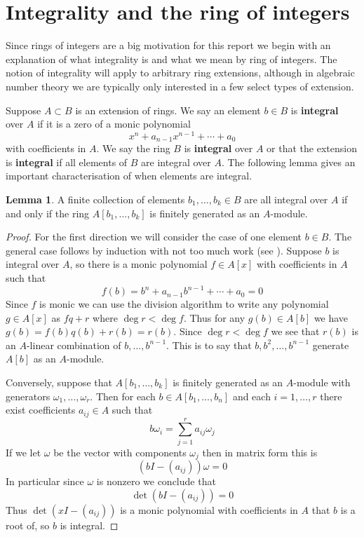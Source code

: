\documentclass{article}
\theoremstyle{definition}
\newcounter{dummy} \numberwithin{dummy}{section}
\newtheorem{lemma}[dummy]{Lemma}
\begin{document}
\section{Integrality and the ring of integers}
Since rings of integers are a big motivation for this report we begin with an explanation of what integrality is and what we mean by ring of integers.
The notion of integrality will apply to arbitrary ring extensions, although in algebraic number theory we are typically only interested in a few select types of extension.

Suppose $A \subset B$ is an extension of rings.
We say an element $b \in B$ is \textbf{integral} over $A$ if it is a zero of a monic polynomial
$$x^n + a_{n-1}x^{n-1}+\cdots+a_0$$
with coefficients in $A$.
We say the ring $B$ is \textbf{integral} over $A$ or that the extension is \textbf{integral} if all elements of $B$ are integral over $A$.
The following lemma gives an important characterisation of when elements are integral.
\begin{lemma}
  \label{intFinGenLemma}
  A finite collection of elements $b_1,\ldots,b_k \in B$ are all integral over $A$ if and only if the ring $A[b_1,\ldots,b_k]$ is finitely generated as an $A$-module.
\end{lemma}
\begin{proof}

For the first direction we will consider the case of one element $b \in B$.
The general case follows by induction with not too much work  (see \citeauthor[Prop. 2.2]{neukirch2013algebraic}).
Suppose $b$ is integral over $A$, so there is a monic polynomial $f \in A[x]$ with coefficients in $A$ such that 
$$f(b) = b^n + a_{n-1}b^{n-1} + \cdots + a_0 = 0$$
Since $f$ is monic we can use the division algorithm to write any polynomial $g \in A[x]$ as $fq+r$ where $\deg r < \deg f$.
Thus for any $g(b) \in A[b]$ we have $g(b)= f(b)q(b)+r(b)=r(b)$.
Since $\deg r < \deg f$ we see that $r(b)$ is an $A$-linear combination of $b,\ldots,b^{n-1}$.
This is to say that $b,b^2,\ldots, b^{n-1}$ generate $A[b]$ as an $A$-module.

Conversely, suppose that $A[b_1,\ldots,b_k]$ is finitely generated as an $A$-module with generators $\omega_1, \ldots, \omega_r$.
Then for each $b\in A[b_1,\ldots,b_n]$ and each $i = 1, \ldots, r$ there exist coefficients $a_{ij} \in A$ such that 
$$b \omega_i = \sum_{j=1}^r a_{ij} \omega_j$$
If we let $\omega$ be the vector with components $\omega_j$ then in matrix form this is
$$ \left(bI - (a_{ij})\right)\omega = 0$$
In particular since $\omega$ is nonzero we conclude that
$$ \det \left(bI - (a_{ij})\right) = 0$$
Thus $\det \left(xI - (a_{ij})\right)$ is a monic polynomial with coefficients in $A$ that $b$ is a root of, so $b$ is integral.
\end{proof}
\end{document}
